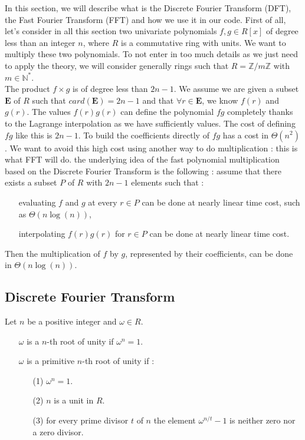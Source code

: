 In this section, we will describe what is the Discrete Fourier Transform (DFT), the Fast Fourier Transform (FFT) and how we use it in our code. First of all, let's consider in all this section two univariate polynomials $f,g \in R[x]$ of degree less than an integer $n$, where $R$ is a commutative ring with units. We want to multiply these two polynomials. To not enter in too much details as we just need to apply the theory, we will consider generally rings such that $R=\mathbb{Z}/m\mathbb{Z}$ with $m\in\mathbb{N}^*$. \\

The product $f\times g$ is of degree less than $2n-1$. We assume we are given a subset $\mathbf{E}$ of $R$ such that $card(\mathbf{E}) = 2n-1$ and that $\forall r \in \mathbf{E}$, we know $f(r)$ and $g(r)$. The values $f(r)g(r)$ can define the polynomial $fg$ completely thanks to the Lagrange interpolation as we have sufficiently values. The cost of defining $fg$ like this is $2n-1$.
To build the coefficients directly of $fg$ has a cost in $\Theta(n^2)$. We want to avoid this high cost using another way to do multiplication : this is what FFT will do. the underlying idea of the fast polynomial multiplication based on the Discrete Fourier Transform is the following : assume that there exists a subset $P$ of $R$ with $2n-1$ elements such that : \\

\begin{itemize}
\item[\textbullet] evaluating $f$ and $g$ at every $r\in P$ can be done at nearly linear time cost, such as $\Theta(n\log(n))$,
\item[\textbullet] interpolating $f(r)g(r)$ for $r\in P$ can be done at nearly linear time cost.
\end{itemize}

Then the multiplication of $f$ by $g$, represented by their coefficients, can be done in $\Theta(n\log(n))$.

\subsection{Discrete Fourier Transform}

\begin{definition*}
Let $n$ be a positive integer and $\omega \in R$. \\
\begin{itemize}
\item[\textbullet] $\omega$ is a $n$-th root of unity if $\omega^{n} = 1$.
\item[\textbullet] $\omega$ is a primitive $n$-th root of unity if :
\begin{itemize}
\item[(1)] $\omega^{n} = 1$.
\item[(2)] $n$ is a unit in $R$.
\item[(3)] for every prime divisor $t$ of $n$ the element $\omega^{n/t} - 1$ is neither zero nor a zero divisor.
\end{itemize}
\end{itemize}
\end{definition*}


